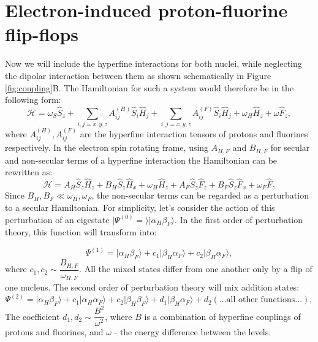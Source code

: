 \documentclass[a4paper, 12pt]{article}
\begin{document}
\section{Electron-induced proton-fluorine flip-flops}
Now we will include the hyperfine interactions for both nuclei, while neglecting the dipolar interaction between them as shown schematically in Figure \ref{fig:coupling}B. The Hamiltonian for such a system would therefore be in the following form:
\begin{equation}
\mathcal{H} =  \omega_S \hat{S}_z + \sum_{i,j=x,y,z} A_{ij}^{(H)} \hat{S}_i \hat{H}_j +  \sum_{i,j=x,y,z} A_{ij}^{(F)} \hat{S}_i \hat{H}_j + \omega_H \hat{H}_z + \omega \hat{F}_z ,
\end{equation}
where $A_{ij}^{(H)}, A_{ij}^{(F)}$ are the hyperfine interaction tensors of protons and fluorines respectively. In the electron spin rotating frame, using $A_{H,F}$ and $B_{H,F}$ for secular and non-secular terms of a hyperfine interaction the Hamiltonian can be rewritten as:
\begin{equation}
\mathcal{H}  = A_H \hat{S}_z \hat{H}_z + B_H \hat{S}_z \hat{H}_x +  \omega_H \hat{H}_z + A_F \hat{S}_z \hat{F}_z + B_F \hat{S}_z \hat{F}_x + \omega_F \hat{F}_z
\end{equation}
Since $B_H, B_F \ll \omega_H, \omega_F $, the non-secular terms can be regarded as a perturbation to a secular Hamiltonian. For simplicity, let's consider the action of this perturbation of an eigestate $\vert \Psi^{(0)} = \rangle  \vert \alpha_H \beta_F \rangle$. In the first order of perturbation theory, this function will transform into:

\begin{equation}
\Psi^{(1)}  =  \vert \alpha_H \beta_F \rangle  + c_1  \vert \beta_H \alpha_F \rangle + c_2  \vert \beta_H \alpha_F \rangle,
\end{equation}
where $c_1, c_2 \sim \dfrac{B_{H,F}}{\omega_{H,F}}$. All the mixed states differ from one another only by a flip of one nucleus. The second order of perturbation theory will mix addition states:
\begin{equation}
\Psi^{(2)}  =  \vert \alpha_H \beta_F \rangle  + c_1  \vert \alpha_H \alpha_F \rangle + c_2  \vert \beta_H \beta_F \rangle + d_1 \vert \beta_H \alpha_F \rangle + d_2(...\text{all other functions}...),
\end{equation}
The coefficient $d_1, d_2 \sim  \dfrac{B^2}{\omega^2}$, where $B$ is a combination of hyperfine couplings of protons and fluorines, and $\omega$ - the energy difference between the levels. 
\end{document}
